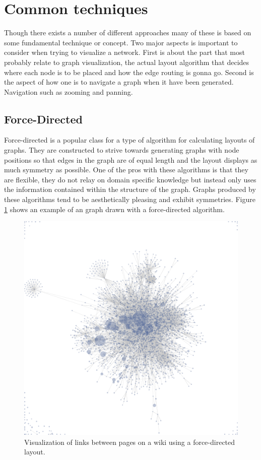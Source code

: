 \documentclass[a4paper,11pt]{kth-mag}
\begin{document}
\section{Common techniques}
Though there exists a number of different approaches many of these is based on some fundamental technique or concept. Two major aspects is important to consider when trying to visualize a network. First is about the part that
most probably relate to graph visualization, the actual layout algorithm that decides where each node is to be placed and how the edge routing is gonna go. Second is the aspect of how one is to navigate a graph when it have been
generated. Navigation such as zooming and panning.
\subsection{Force-Directed}
Force-directed is a popular class for a type of algorithm for calculating layouts of graphs. They are constructed to strive towards generating graphs with node positions so that edges in the graph are of equal length and the layout
displays as much symmetry as possible. One of the pros with these algorithms is that they are flexible, they do not relay on domain specific knowledge but instead only uses the information contained within the structure of the graph. Graphs produced
by these algorithms tend to be aesthetically pleasing and exhibit symmetries\cite{1338}. Figure \ref{fig:force_directed_ex1} shows an example of an graph drawn with a force-directed algorithm.

\begin{figure}[!htbp]
	\centering
	\includegraphics[scale=0.3]{ForceDirectedEx1}
	\caption{Visualization of links between pages on a wiki using a force-directed layout.}
	\label{fig:force_directed_ex1}
\end{figure}
\end{document}
